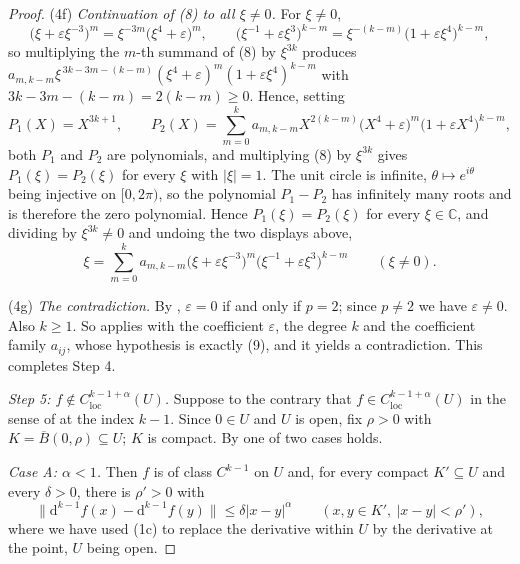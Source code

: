\begin{proof}
\noindent(4f) \emph{Continuation of (8) to all $\xi\neq0$.}  For $\xi\neq0$,
\[
  \bigl(\xi+\varepsilon\xi^{-3}\bigr)^{m}=\xi^{-3m}\bigl(\xi^{4}+\varepsilon
  \bigr)^{m},\qquad
  \bigl(\xi^{-1}+\varepsilon\xi^{3}\bigr)^{k-m}
  =\xi^{-(k-m)}\bigl(1+\varepsilon\xi^{4}\bigr)^{k-m},
\]
so multiplying the $m$-th summand of (8) by $\xi^{3k}$ produces
$a_{m,k-m}\xi^{\,3k-3m-(k-m)}(\xi^{4}+\varepsilon)^{m}
(1+\varepsilon\xi^{4})^{k-m}$ with
$3k-3m-(k-m)=2(k-m)\ge0$.  Hence, setting
\[
  P_1(X)=X^{3k+1},\qquad
  P_2(X)=\sum_{m=0}^{k}a_{m,k-m}X^{2(k-m)}
    \bigl(X^{4}+\varepsilon\bigr)^{m}
    \bigl(1+\varepsilon X^{4}\bigr)^{k-m},
\]
both $P_1$ and $P_2$ are polynomials, and multiplying (8) by $\xi^{3k}$ gives
$P_1(\xi)=P_2(\xi)$ for every $\xi$ with $|\xi|=1$.  The unit circle is
infinite, $\theta\mapsto e^{i\theta}$ being injective on $[0,2\pi)$, so the
polynomial $P_1-P_2$ has infinitely many roots and is therefore the zero
polynomial.  Hence $P_1(\xi)=P_2(\xi)$ for every $\xi\in\mathbb{C}$, and
dividing by $\xi^{3k}\neq0$ and undoing the two displays above,
\begin{equation}\tag{9}
  \xi=\sum_{m=0}^{k}a_{m,k-m}
    \bigl(\xi+\varepsilon\xi^{-3}\bigr)^{m}
    \bigl(\xi^{-1}+\varepsilon\xi^{3}\bigr)^{k-m}
  \qquad(\xi\neq0).
\end{equation}

\noindent(4g) \emph{The contradiction.}  By ,
$\varepsilon=0$ if and only if $p=2$; since $p\neq2$ we have
$\varepsilon\neq0$.  Also $k\ge1$.  So  applies with
the coefficient $\varepsilon$, the degree $k$ and the coefficient family
$a_{ij}$, whose hypothesis is exactly (9), and it yields a contradiction.  This
completes Step 4.

\emph{Step 5: $f\notin C^{k-1+\alpha}_{\mathrm{loc}}(U)$.}  Suppose to the
contrary that $f\in C^{k-1+\alpha}_{\mathrm{loc}}(U)$ in the sense of
 at the index $k-1$.  Since $0\in U$ and $U$ is open,
fix $\rho>0$ with $K=\overline{B}(0,\rho)\subseteq U$; $K$ is compact.  By
 one of two cases holds.

\noindent\emph{Case A: $\alpha<1$.}  Then $f$ is of class $C^{k-1}$ on $U$ and,
for every compact $K'\subseteq U$ and every $\delta>0$, there is $\rho'>0$ with
\begin{equation}\tag{10}
  \bigl\|\mathrm{d}^{k-1}f(x)-\mathrm{d}^{k-1}f(y)\bigr\|
  \le\delta|x-y|^{\alpha}\qquad(x,y\in K',\ |x-y|<\rho'),
\end{equation}
where we have used (1c) to replace the derivative within $U$ by the derivative
at the point, $U$ being open.


\end{proof}
